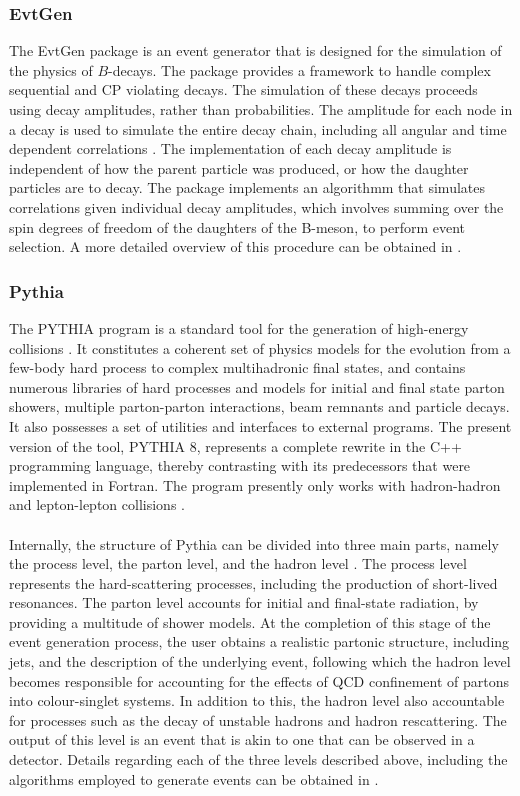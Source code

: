 \subsubsection{EvtGen}\label{EvtGen}
The EvtGen package is an event generator that is designed for the simulation of the physics of $B$-decays. The package provides a framework to handle complex sequential and CP violating decays. The simulation of these decays proceeds
using decay amplitudes, rather than probabilities. The amplitude for each node in a decay is used to simulate the entire decay chain, including all angular and time dependent correlations \cite{LANGE2001152}. The implementation of each decay amplitude is independent
of how the parent particle was produced, or how the daughter particles are to decay. The package implements an algorithmm that simulates correlations given individual decay amplitudes, which involves summing over the spin degrees of freedom of the daughters of the B-meson, to perform event selection. A more
detailed overview of this procedure can be obtained in \cite{LANGE2001152}.
\subsubsection{Pythia}
The PYTHIA program is a standard tool for the generation of high-energy collisions \cite{SJOSTRAND2015159}. It constitutes a coherent set of
physics models for the evolution from a few-body hard process to complex multihadronic final states, and contains numerous libraries of 
hard processes and models for initial and final state parton showers, multiple parton-parton interactions, beam remnants and particle decays. It 
also possesses a set of utilities and interfaces to external programs. The present version of the tool, PYTHIA 8, represents a complete rewrite in the C++ programming language, thereby contrasting
with its predecessors that were implemented in Fortran. The program presently only works with hadron-hadron and lepton-lepton collisions \cite{SJOSTRAND2015159}.\\
\\
Internally, the structure of Pythia can be divided into three main parts, namely the process level, the parton level, and the hadron level \cite{Bierlich:2022pfr}. The process level represents the hard-scattering processes, including the
production of short-lived resonances. The parton level accounts for initial and final-state radiation, by providing a multitude of shower models. At the completion of this stage of the event generation process, the user obtains a realistic
partonic structure, including jets, and the description of the underlying event, following which the hadron level becomes responsible for accounting for the effects of QCD confinement of partons into colour-singlet systems. In addition to this, the hadron level
also accountable for processes such as the decay of unstable hadrons and hadron rescattering. The output of this level is an event that is akin to one that can be observed in a detector. Details regarding each of the three levels described above, including the algorithms employed to generate
events can be obtained in \cite{Bierlich:2022pfr}.
